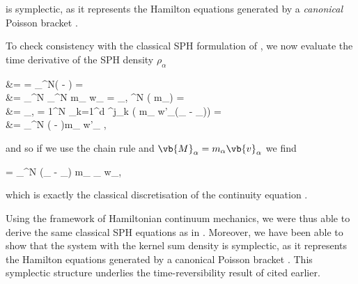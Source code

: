\documentclass[../main.tex]{subfiles}
\begin{document}
is symplectic, as it represents the Hamilton equations generated by a \emph{canonical} Poisson bracket .

To check consistency with the classical SPH formulation of , we now evaluate the time derivative of the SPH density $\rho_{\alpha}$ 
\begin{equations}[columns,*]
	 &= \pbr[SPH]{\rho_{\alpha}}{\totenSPH} = \sum_{}^N\left(  -  \right) = \\ 
			      &= \sum_{}^N   \sum_{}^N m_{\gamma} w_{\alpha \gamma} = \sum_{\beta, }^N \left( m_{\gamma}\right) = \\ 
			      &= \sum_{\beta, \gamma = 1}^N \sum_{k=1}^d \delta^j_k \left( m_{\gamma} w'_{\alpha \gamma}\left(\delta_{\alpha \beta} - \delta_{\gamma \beta}\right)\right) = \\ 
			      &= \sum_{}^N \left( - \right)m_{\gamma} w'_{\alpha \gamma} ,
\end{equations}

and so if we use the chain rule and $\vb{M}_{\alpha} = m_{\alpha} \vb{v}_{\alpha}$ we find

\begin{equations}[single,*]
	 = \sum_{}^N \left(_{\alpha} - _{\beta}\right) m_{\beta} \grad_{\alpha} w_{\alpha \beta},
\end{equations}

which is exactly the classical discretisation of the continuity equation .

Using the framework of Hamiltonian continuum mechanics, we were thus able to derive the same classical SPH equations as in . Moreover, we have been able to show that the system  with the kernel sum density  is symplectic, as it represents the Hamilton equations generated by a canonical Poisson bracket . This symplectic structure underlies the time-reversibility result of \autocite{kinclGloballyTimereversibleFluid2023a} cited earlier.
\end{document}
